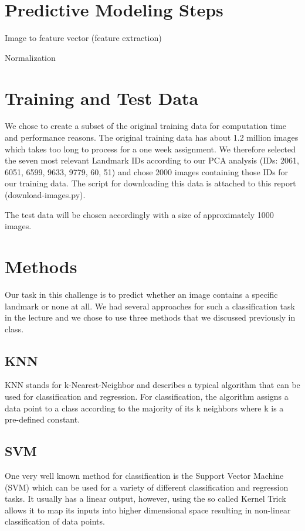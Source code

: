 \chapter{Predictive Modeling Steps}

Image to feature vector (feature extraction)

Normalization

\chapter{Training and Test Data}

We chose to create a subset of the original training data for computation time and performance reasons. The original training data has about 1.2 million images which takes too long to process for a one week assignment. We therefore selected the seven most relevant Landmark IDs according to our PCA analysis (IDs: 2061, 6051, 6599, 9633, 9779, 60, 51) and chose 2000 images containing those IDs for our training data. The script for downloading this data is attached to this report (download-images.py).

The test data will be chosen accordingly with a size of approximately 1000 images.

\chapter{Methods}

Our task in this challenge is to predict whether an image contains a specific landmark or none at all. We had several approaches for such a classification task in the lecture and we chose to use three methods that we discussed previously in class.

\section{KNN}

KNN stands for k-Nearest-Neighbor and describes a typical algorithm that can be used for classification and regression. For classification, the algorithm assigns a data point to a class according to the majority of its k neighbors where k is a pre-defined constant.

\section{SVM}

One very well known method for classification is the Support Vector Machine (SVM) which can be used for a variety of different classification and regression tasks. It usually has a linear output, however, using the so called Kernel Trick allows it to map its inputs into higher dimensional space resulting in non-linear classification of data points.

